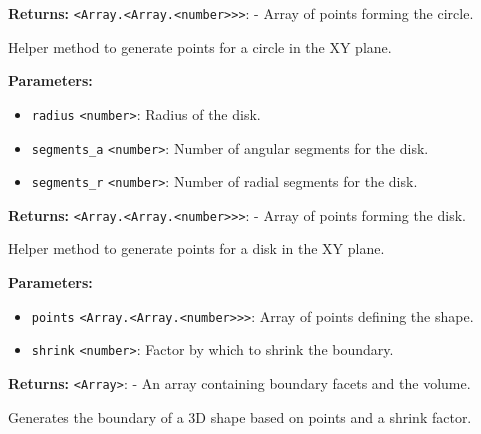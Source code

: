 \documentclass[12pt,a4paper]{article}
\begin{document}
\noindent \textbf{Returns:} \texttt{<Array.<Array.<number>>>}: - Array of points forming the circle.

\noindent Helper method to generate points for a circle in the XY plane.

\vspace{5mm}
\noindent {}


\noindent \textbf{Parameters:}
\begin{itemize}
  \item \texttt{radius} \texttt{<number>}: Radius of the disk.
  \item \texttt{segments\_a} \texttt{<number>}: Number of angular segments for the disk.
  \item \texttt{segments\_r} \texttt{<number>}: Number of radial segments for the disk.
\end{itemize}

\noindent \textbf{Returns:} \texttt{<Array.<Array.<number>>>}: - Array of points forming the disk.

\noindent Helper method to generate points for a disk in the XY plane.

\vspace{5mm}
\noindent {}


\noindent \textbf{Parameters:}
\begin{itemize}
  \item \texttt{points} \texttt{<Array.<Array.<number>>>}: Array of points defining the shape.
  \item \texttt{shrink} \texttt{<number>}: Factor by which to shrink the boundary.
\end{itemize}

\noindent \textbf{Returns:} \texttt{<Array>}: - An array containing boundary facets and the volume.

\noindent Generates the boundary of a 3D shape based on points and a shrink factor.

\vspace{5mm}
\noindent {}
\end{document}
